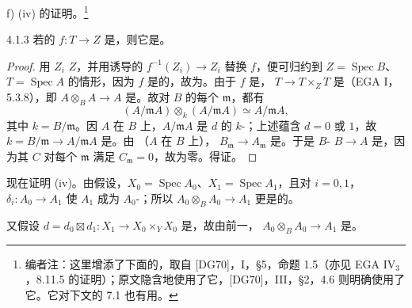 f) (iv) 的证明。\footnote{编者注：这里增添了下面的，取自 [DG70]，I，§5，命题 1.5（亦见 EGA IV$_3$，8.11.5 的证明）；原文隐含地使用了它，[DG70]，III，§2，4.6 则明确使用了它。它对下文的 7.1 也有用。}
\begin{SGAresult}{}{4.1.3}
若的 $f:T\to Z$ 是，则它是。
\end{SGAresult}
\begin{proof}
用 $Z_i$  $Z$，并用诱导的 $f^{-1}(Z_i)\to Z_i$ 替换 $f$，便可归约到 $Z=\operatorname{Spec}B$、$T=\operatorname{Spec}A$ 的情形，因为 $f$ 是的，故为。由于 $f$ 是， $T\to T\times_ZT$ 是（EGA I，5.3.8），即 $A\otimes_BA\to A$ 是。故对 $B$ 的每个 $\mathfrak m$，都有
\[(A/\mathfrak mA)\otimes_k(A/\mathfrak mA)\simeq A/\mathfrak mA,\]
其中 $k=B/\mathfrak m$。因 $A$ 在 $B$ 上，$A/\mathfrak mA$ 是 $d$ 的 $k$-；上述蕴含 $d=0$ 或 $1$，故 $k=B/\mathfrak m\to A/\mathfrak mA$ 是。由 （$A$ 在 $B$ 上）， $B_{\mathfrak m}\to A_{\mathfrak m}$ 是。于是 $B$- $B\to A$ 是，因为其 $C$ 对每个 $\mathfrak m$ 满足 $C_{\mathfrak m}=0$，故为零。得证。
\end{proof}
现在证明 (iv)。由假设，$X_0=\operatorname{Spec}A_0$、$X_1=\operatorname{Spec}A_1$，且对 $i=0,1$， $\delta_i:A_0\to A_1$ 使 $A_1$ 成为 $A_0$-；所以 $A_0\otimes_BA_0\to A_1$ 更是的。

又假设 $d=d_0\boxtimes d_1:X_1\to X_0\times_YX_0$ 是，故由前一， $A_0\otimes_BA_0\to A_1$ 是。

